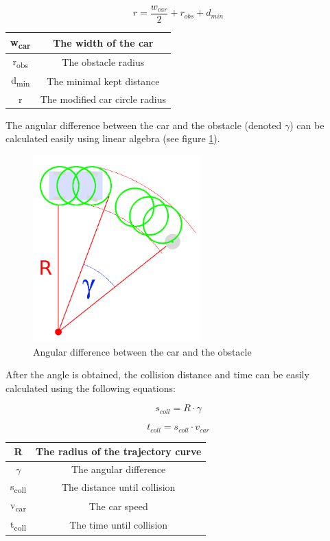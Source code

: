 \[ r = \frac{w_{car}}{2} + r_{obs} + d_{min} \]

\begin{center}
    \begin{tabular}{ | c | c | }
        \hline
        w\textsubscript{car}  	& The width of the car            	\\
        \hline
        r\textsubscript{obs}  	& The obstacle radius         	    \\
        \hline 
        d\textsubscript{min}    & The minimal kept distance      	\\
        \hline 
        r       				& The modified car circle radius    \\
        \hline
    \end{tabular}
\end{center}

The angular difference between the car and the obstacle (denoted $\gamma$) can be calculated easily using linear algebra (see figure \ref{static_collision_time_check_angle}).

\begin{figure}[!ht]
    \centering
    \includegraphics[height=72mm]{figures/raw/static_collision_time_check_angle.png}
    \caption{Angular difference between the car and the obstacle}
    \label{static_collision_time_check_angle}
\end{figure}

After the angle is obtained, the collision distance and time can be easily calculated using the following equations:

\[ s_{coll} = R \cdot \gamma \]

\[ t_{coll} = s_{coll} \cdot v_{car} \]

\begin{center}
    \begin{tabular}{ | c | c | }
        \hline
        R  						& The radius of the trajectory curve    \\
        \hline
        $\gamma$  				& The angular difference            	\\
        \hline
        s\textsubscript{coll}  	& The distance until collision         	\\
        \hline
        v\textsubscript{car}  	& The car speed         	    		\\
        \hline 
        t\textsubscript{coll}  	& The time until collision            	\\
        \hline
    \end{tabular}
\end{center}

